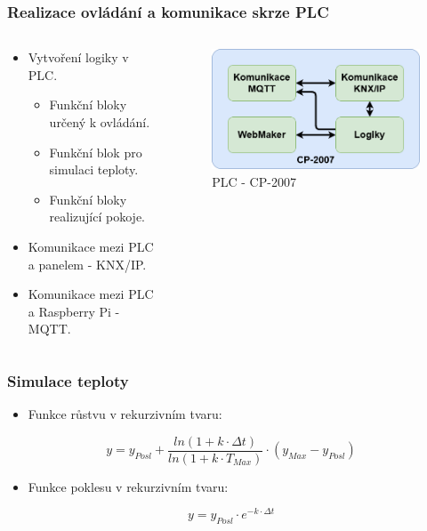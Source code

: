 \documentclass[%
  12pt,       				%
	t,                  %
	aspectratio=1610,   %
	unicode,						%
]{beamer}				    	%
\begin{document}
\begin{frame} 
	\frametitle{Realizace ovládání a komunikace skrze PLC}
	\begin{columns}
		\begin{column}{0.7\textwidth}
			
			\begin{itemize}
				\item Vytvoření logiky v PLC.
				\begin{itemize}
					\item Funkční bloky určený k ovládání.
					\item Funkční blok pro simulaci teploty.
					\item Funkční bloky realizující pokoje.
				\end{itemize}
				\item Komunikace mezi PLC a panelem - KNX/IP.
				\item Komunikace mezi PLC a Raspberry Pi - MQTT.
			\end{itemize}
		\end{column}
		\begin{column}{0.3\textwidth}
			\begin{figure} [!ht]	
				\centering
				\includegraphics[width=1\columnwidth]{obrazky/plc.png}
				\caption{PLC - CP-2007}
			\end{figure}		
		\end{column}
	\end{columns}
\end{frame}

\begin{frame} 
	\frametitle{Simulace teploty}
	\begin{itemize}
		\item Funkce růstvu v rekurzivním tvaru:
	\end{itemize}
	\begin{equation}
		y = y_{Posl} + \frac{ln(1 + k \cdot \Delta t)}{ln(1 + k \cdot T_{Max})} \cdot (y_{Max} - y_{Posl}) 
	\end{equation}
	\begin{itemize}
		\item Funkce poklesu v rekurzivním tvaru:
	\end{itemize}
	\begin{equation}
		y = y_{Posl} \cdot e^{-k \cdot \Delta t}
	\end{equation}		
\end{frame}
\end{document}
